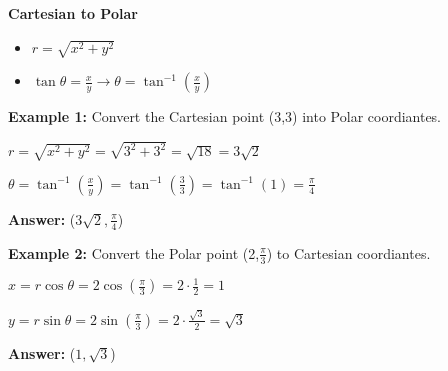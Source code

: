 \documentclass[10pt]{article}                               %
\begin{document}
\begin{defaultbox}
\begin{adjustwidth}{2em}{0pt}
\begin{adjustwidth}{2em}{0pt}
            \vspace{0.5em}

            \textbf{Cartesian to Polar}

            \begin{itemize}
                \item \( r = \sqrt{x^2 + y^2} \)
                \item \( \tan\theta = \frac{x}{y}  \rightarrow  \theta = \tan^{-1}\left(\frac{x}{y}\right) \)
            \end{itemize}

            \vspace{0.5em}


            \begin{examplebox}

                \textbf{Example 1:} Convert the Cartesian point (3,3) into Polar coordiantes.
                \vspace{0.5em}

                \begin{adjustwidth}{2em}{0pt}

                    \( r = \sqrt{x^2 + y^2} = \sqrt{3^2 + 3^2} = \sqrt{18} = 3\sqrt{2} \)

                    \( \theta = \tan^{-1}\left(\frac{x}{y}\right) = \tan^{-1}\left(\frac{3}{3}\right) = \tan^{-1}(1) = \frac{\pi}{4} \)

                    \textbf{Answer:} (\( 3\sqrt{2}, \frac{\pi}{4} \))

                \end{adjustwidth}

                \vspace{1em}

                \textbf{Example 2:} Convert the Polar point (2,\( \frac{\pi}{3} \)) to Cartesian coordiantes.
                \vspace{0.5em}

                \begin{adjustwidth}{2em}{0pt}

                    \( x = r\cos\theta = 2\cos\left(\frac{\pi}{3}\right) = 2 \cdot \frac{1}{2} = 1 \)

                    \( y = r\sin\theta = 2\sin\left(\frac{\pi}{3}\right) = 2 \cdot \frac{\sqrt{3}}{2} = \sqrt{3} \)

                    \textbf{Answer:} (\( 1,\sqrt{3} \))

                \end{adjustwidth}


\end{examplebox}
\end{adjustwidth}
\end{adjustwidth}
\end{defaultbox}
\end{document}
